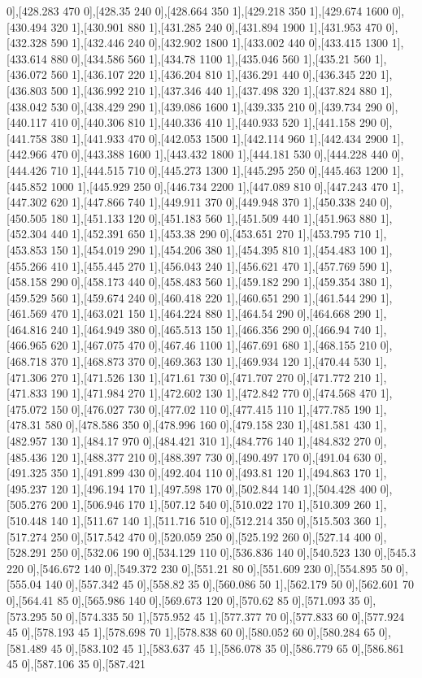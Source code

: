 {0],[428.283 470 0],[428.35 240 0],[428.664 350 1],[429.218 350 1],[429.674 1600 0],[430.494 320 1],[430.901 880 1],[431.285 240 0],[431.894 1900 1],[431.953 470 0],[432.328 590 1],[432.446 240 0],[432.902 1800 1],[433.002 440 0],[433.415 1300 1],[433.614 880 0],[434.586 560 1],[434.78 1100 1],[435.046 560 1],[435.21 560 1],[436.072 560 1],[436.107 220 1],[436.204 810 1],[436.291 440 0],[436.345 220 1],[436.803 500 1],[436.992 210 1],[437.346 440 1],[437.498 320 1],[437.824 880 1],[438.042 530 0],[438.429 290 1],[439.086 1600 1],[439.335 210 0],[439.734 290 0],[440.117 410 0],[440.306 810 1],[440.336 410 1],[440.933 520 1],[441.158 290 0],[441.758 380 1],[441.933 470 0],[442.053 1500 1],[442.114 960 1],[442.434 2900 1],[442.966 470 0],[443.388 1600 1],[443.432 1800 1],[444.181 530 0],[444.228 440 0],[444.426 710 1],[444.515 710 0],[445.273 1300 1],[445.295 250 0],[445.463 1200 1],[445.852 1000 1],[445.929 250 0],[446.734 2200 1],[447.089 810 0],[447.243 470 1],[447.302 620 1],[447.866 740 1],[449.911 370 0],[449.948 370 1],[450.338 240 0],[450.505 180 1],[451.133 120 0],[451.183 560 1],[451.509 440 1],[451.963 880 1],[452.304 440 1],[452.391 650 1],[453.38 290 0],[453.651 270 1],[453.795 710 1],[453.853 150 1],[454.019 290 1],[454.206 380 1],[454.395 810 1],[454.483 100 1],[455.266 410 1],[455.445 270 1],[456.043 240 1],[456.621 470 1],[457.769 590 1],[458.158 290 0],[458.173 440 0],[458.483 560 1],[459.182 290 1],[459.354 380 1],[459.529 560 1],[459.674 240 0],[460.418 220 1],[460.651 290 1],[461.544 290 1],[461.569 470 1],[463.021 150 1],[464.224 880 1],[464.54 290 0],[464.668 290 1],[464.816 240 1],[464.949 380 0],[465.513 150 1],[466.356 290 0],[466.94 740 1],[466.965 620 1],[467.075 470 0],[467.46 1100 1],[467.691 680 1],[468.155 210 0],[468.718 370 1],[468.873 370 0],[469.363 130 1],[469.934 120 1],[470.44 530 1],[471.306 270 1],[471.526 130 1],[471.61 730 0],[471.707 270 0],[471.772 210 1],[471.833 190 1],[471.984 270 1],[472.602 130 1],[472.842 770 0],[474.568 470 1],[475.072 150 0],[476.027 730 0],[477.02 110 0],[477.415 110 1],[477.785 190 1],[478.31 580 0],[478.586 350 0],[478.996 160 0],[479.158 230 1],[481.581 430 1],[482.957 130 1],[484.17 970 0],[484.421 310 1],[484.776 140 1],[484.832 270 0],[485.436 120 1],[488.377 210 0],[488.397 730 0],[490.497 170 0],[491.04 630 0],[491.325 350 1],[491.899 430 0],[492.404 110 0],[493.81 120 1],[494.863 170 1],[495.237 120 1],[496.194 170 1],[497.598 170 0],[502.844 140 1],[504.428 400 0],[505.276 200 1],[506.946 170 1],[507.12 540 0],[510.022 170 1],[510.309 260 1],[510.448 140 1],[511.67 140 1],[511.716 510 0],[512.214 350 0],[515.503 360 1],[517.274 250 0],[517.542 470 0],[520.059 250 0],[525.192 260 0],[527.14 400 0],[528.291 250 0],[532.06 190 0],[534.129 110 0],[536.836 140 0],[540.523 130 0],[545.3 220 0],[546.672 140 0],[549.372 230 0],[551.21 80 0],[551.609 230 0],[554.895 50 0],[555.04 140 0],[557.342 45 0],[558.82 35 0],[560.086 50 1],[562.179 50 0],[562.601 70 0],[564.41 85 0],[565.986 140 0],[569.673 120 0],[570.62 85 0],[571.093 35 0],[573.295 50 0],[574.335 50 1],[575.952 45 1],[577.377 70 0],[577.833 60 0],[577.924 45 0],[578.193 45 1],[578.698 70 1],[578.838 60 0],[580.052 60 0],[580.284 65 0],[581.489 45 0],[583.102 45 1],[583.637 45 1],[586.078 35 0],[586.779 65 0],[586.861 45 0],[587.106 35 0],[587.421 }
